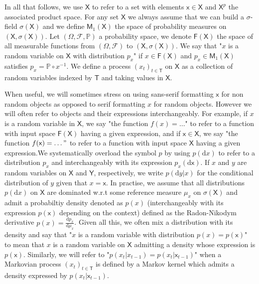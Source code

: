 \documentclass{article}
\newcommand{\1}{\mathbbm{1}}
\newcommand{\rmd}{\ensuremath{\mathrm{d}}}
\newcounter{example}[section]
\begin{document}
In all that follows, we use $\mathsf{X}$ to refer to a set with elements $\mathsf{x} \in \mathsf{X}$ and $\mathsf{X}^p$ the associated product space.  For any set $\mathsf{X}$ we always assume that we can build a $\sigma$-field $\sigma(\mathsf{X})$ and we define $\mathsf{M}_1(\mathsf{X})$ the space of probability measures on $(\mathsf{X},\sigma(\mathsf{X}))$. Let $(\mathsf{\Omega},\mathcal{F},\mathbb{P})$ a probability space, we denote $\mathsf{F(X)}$ the space of all measurable functions from $(\mathsf{\Omega},\mathcal{F})$ to $(\mathsf{X},\sigma(\mathsf{X}))$. We say that "$x$ is a random variable on $\mathsf{X}$ with distribution $p_x$" if $x \in \mathsf{F(X)}$ and $p_x \in \mathsf{M}_1(\mathsf{X})$ satisfies $p_x = \mathbb{P} \circ x^{-1}$.  We define a process $(x_t)_{t \in \mathsf{T}}$ on $\mathsf{X}$ as a collection of random variables indexed by $\mathsf{T}$ and taking values in $\mathsf{X}$. 

When useful, we will sometimes stress on using sans-serif formatting $\mathsf{x}$ for non random objects as opposed to serif formatting $x$ for random objects. However we will often refer to objects and their expressions interchangeably. For example, if $x$ is a random variable in $\mathsf{X}$, we say "the function $f(x) = \ldots $" to refer to a function with input space $\mathsf{F(X)}$ having a given expression, and if $\mathsf{x} \in \mathsf{X}$, we say "the function $f(\mathsf{x}) = \ldots"$ to refer to a function with input space $\mathsf{X}$ having a given expression.We systematically overload the symbol $p$ by using $p(\rmd x)$ to refer to a distribution $p_x$ and interchangeably with its expression $p_x(\mathsf{\rmd x})$. If $x$ and $y$ are random variables on $\mathsf{X}$ and $\mathsf{Y}$, respectively, we write $p(\rmd y|x)$ for the conditional distribution of $y$ given that $x = \mathsf{x}$. In practise, we assume that all distributions $p(\rmd x)$ on $\mathsf{X}$ are dominated w.r.t some reference measure $\mu_x$ on $\sigma(\mathsf{X})$ and admit a probabiltiy density denoted as $p(x)$ (interchangeably with its expression $p(\mathsf{x})$ depending on the context) defined as the Radon-Nikodym derivative $p(x) = \frac{\rmd p_x}{\rmd \mu_x}$. Given all this, we often mix a distribution with its density and say that "$x$ is a random variable with distribution $p(x) = p(\mathsf{x})$" to mean that $x$ is a random variable on $\mathsf{X}$ admitting a density whose expression is $p(\mathsf{x})$. Similarly, we will refer to "$p(x_t|x_{t-1}) = p(x_t|\mathsf{x}_{t-1})$" when a Markovian process $(x_t)_{t \in \mathsf{T}}$ is defined by a Markov kernel which admits a density expressed by $p(x_t|\mathsf{x}_{t-1})$.
\end{document}
